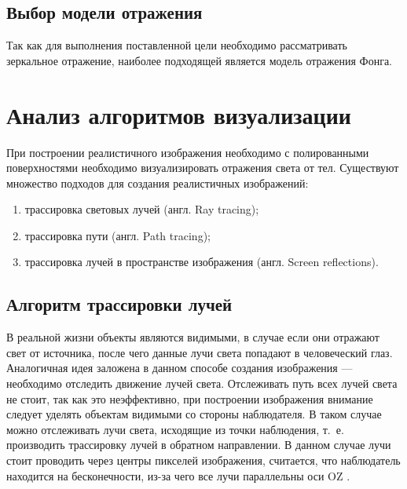 \subsection{Выбор модели отражения}

Так как для выполнения поставленной цели необходимо рассматривать зеркальное отражение, наиболее подходящей является модель отражения Фонга.






\section{Анализ алгоритмов визуализации}




При построении реалистичного изображения необходимо с полированными поверхностями необходимо визуализировать отражения света от тел.
Существуют множество подходов для создания реалистичных изображений:
\begin{enumerate}
	\item трассировка световых лучей (англ. Ray tracing);
	\item трассировка пути (англ. Path  tracing);
	\item трассировка лучей в пространстве изображения (англ. Screen reflections).
\end{enumerate}





\subsection{Алгоритм трассировки лучей}
\label{sec:ray_tracing}
В реальной жизни объекты являются видимыми, в случае если они отражают свет от источника, после чего данные лучи света попадают в человеческий глаз. Аналогичная идея заложена в данном способе создания изображения --- необходимо отследить движение лучей света.
Отслеживать путь всех лучей света не стоит, так как это неэффективно, при построении изображения внимание следует уделять объектам видимыми со стороны наблюдателя.
В таком случае можно отслеживать лучи света, исходящие из точки наблюдения, т.~е. производить трассировку лучей в обратном направлении. В данном случае лучи стоит проводить через центры пикселей изображения,
считается, что наблюдатель находится на бесконечности, из-за чего все лучи параллельны оси OZ \cite{Rodgers,modern_ray_tracing}.




